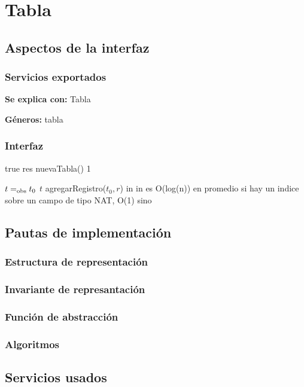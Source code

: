 \section{Tabla}

\subsection{Aspectos de la interfaz}

\subsubsection{Servicios exportados}

\textbf{Se explica con:} Tabla

\textbf{Géneros:} tabla

\subsubsection{Interfaz}

{true}
{res \igobs nuevaTabla()}
{1}
{}
{}

{$t =_{\mathrm{obs}} t_0$}
{$t$ \igobs agregarRegistro($t_0,r$)}
{in}
{}
{in es O(log(n)) en promedio si hay un indice sobre un campo de tipo NAT, O(1) sino}

\subsection{Pautas de implementación}

\subsubsection{Estructura de representación}

\subsubsection{Invariante de represantación}

\subsubsection{Función de abstracción}

\subsubsection{Algoritmos}

\subsection{Servicios usados}

